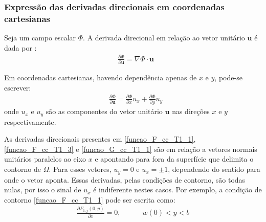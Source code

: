 \subsubsection{Expressão das derivadas direcionais em coordenadas cartesianas}\label{secao_sobre_normal}
Seja um campo escalar $\Phi$. A derivada direcional em relação ao vetor unitário $\mathbf{u}$ é dada por \citep{livro_stewart}:
\begin{align}
	& \frac{\partial\Phi}{\partial\mathbf{u}} = \nabla \Phi \cdot \mathbf{u} 
\end{align} 

Em coordenadas cartesianas, havendo dependência apenas de $x$ e $y$, pode-se escrever:
\begin{align}
	& \frac{\partial\Phi}{\partial\mathbf{u}} = \frac{\partial \Phi}{\partial x}u_x + \frac{\partial \Phi}{\partial y}u_y\label{derivada_direcional_coodernadas_cartesianas}
\end{align}
onde $u_x$ e $u_y$ são as componentes do vetor unitário $\mathbf{u}$ nas direções $x$ e $y$ respectivamente.

As derivadas direcionais presentes em \eqref{funcao_F_cc_T1_1}, \eqref{funcao_F_cc_T1_3} e \eqref{funcao_G_cc_T1_1}
são em relação a vetores normais unitários paralelos ao eixo $x$ e apontando para fora da superfície que delimita o contorno de $\Omega$. 
Para esses vetores, $u_y = 0$ e $u_x = \pm 1$, dependendo do sentido para onde o vetor aponta. Essas derivadas, pelas condições de contorno, são
todas nulas, por isso o sinal de $u_x$ é indiferente nestes casos. Por exemplo, a condição de contorno \eqref{funcao_F_cc_T1_1} pode
ser escrita como:
\begin{align}
	\frac{\partial F_{1,j}(0, y)}{\partial x} = 0, \quad\quad\quad w(0) < y < b 
\end{align}

